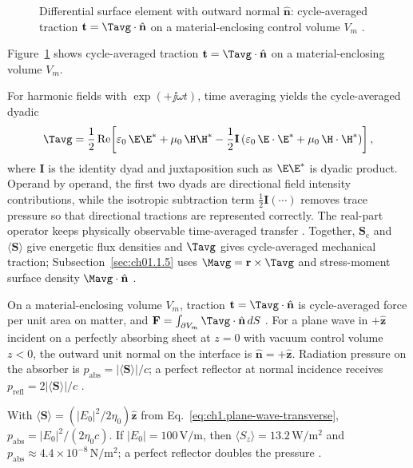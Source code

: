 \begin{figure}[t]
\centering
\VolIPhysFig{\VolIPhysStressTraction}
\caption{Differential surface element with outward normal $\hat{\mathbf{n}}$: cycle-averaged traction $\mathbf{t}=\Tavg\cdot\hat{\mathbf{n}}$ on a material-enclosing control volume $V_m$ \cite{maxwell1873,stratton1941}.}
\label{fig:ch1.stress-traction-element}
\end{figure}

Figure~\ref{fig:ch1.stress-traction-element} shows cycle-averaged traction $\mathbf{t}=\Tavg\cdot\hat{\mathbf{n}}$ on a material-enclosing volume $V_m$.

For harmonic fields with $\exp(+\jj\omega t)$, time averaging yields the cycle-averaged dyadic
\begin{equation}
\label{eq:ch1.maxwell-stress}
\Tavg
=\frac{1}{2}\Re\!\left[
\varepsilon_0\,\E\E^*
+\mu_0\,\H\H^*
-\frac{1}{2}\mathbf{I}
\left(\varepsilon_0\,\E\cdot\E^*+\mu_0\,\H\cdot\H^*\right)
\right],
\end{equation}
where \(\mathbf{I}\) is the identity dyad and juxtaposition such as \(\E\E^*\)
is dyadic product. Operand by operand, the first two dyads are directional field
intensity contributions, while the isotropic subtraction term
\(\tfrac{1}{2}\mathbf{I}(\cdots)\) removes trace pressure so that directional
tractions are represented correctly. The real-part operator keeps physically
observable time-averaged transfer \cite{stratton1941}.
Together, $\mathbf{S}_\mathrm{c}$ and $\langle\mathbf{S}\rangle$ give energetic flux densities and $\Tavg$ gives cycle-averaged mechanical traction; Subsection~\ref{sec:ch01.1.5} uses $\Mavg=\mathbf{r}\times\Tavg$ and stress-moment surface density $\Mavg\cdot\hat{\mathbf{n}}$ \cite{poynting1884}.

On a material-enclosing volume $V_m$, traction $\mathbf{t}=\Tavg\cdot\hat{\mathbf{n}}$ is cycle-averaged force per unit area on matter, and $\mathbf{F}=\int_{\partial V_m}\Tavg\cdot\hat{\mathbf{n}}\,dS$ \cite{stratton1941}.
For a plane wave in $+\hat{\mathbf{z}}$ incident on a perfectly absorbing sheet at
$z=0$ with vacuum control volume $z<0$, the outward unit normal on the interface is
$\hat{\mathbf{n}}=+\hat{\mathbf{z}}$. Radiation pressure on the absorber is
$p_{\mathrm{abs}}=|\langle\mathbf{S}\rangle|/c$; a perfect reflector at normal incidence receives
$p_{\mathrm{refl}}=2|\langle\mathbf{S}\rangle|/c$ \cite{stratton1941,maxwell1873}.

\begin{example}
\label{ex:ch1.radiation-pressure}
With $\langle\mathbf{S}\rangle=(|E_0|^2/2\eta_0)\hat{\mathbf{z}}$ from Eq.~\eqref{eq:ch1.plane-wave-transverse}, $p_{\mathrm{abs}}=|E_0|^2/(2\eta_0 c)$. If $|E_0|=100\,\mathrm{V/m}$, then $\langle S_z\rangle=13.2\,\mathrm{W/m^2}$ and $p_{\mathrm{abs}}\approx4.4\times10^{-8}\,\mathrm{N/m^2}$; a perfect reflector doubles the pressure \cite{stratton1941}.
\end{example}

